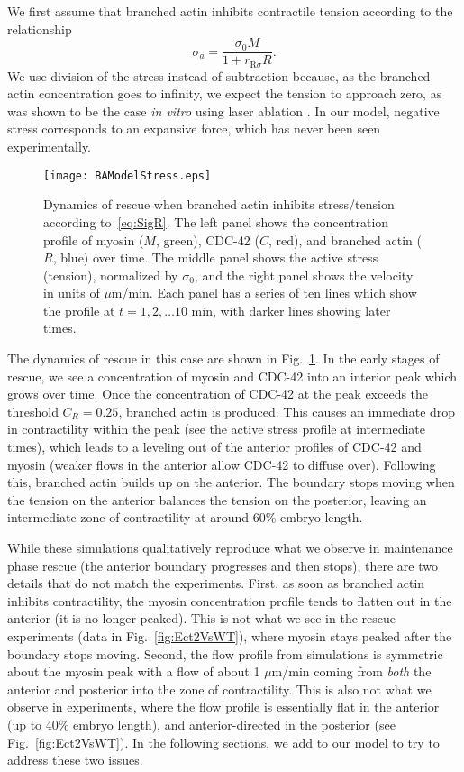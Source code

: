 \documentclass[11pt]{article}
\newcommand{\6}[1]{#1_{\text{6}}}
\newcommand{\3}[1]{#1_{\text{3}}}
\begin{document}
We first assume that branched actin inhibits contractile tension according to the relationship
\begin{equation}
\label{eq:SigR}
\sigma_a = \frac{\sigma_0 M}{1+r_\text{R$\sigma$}R}.
\end{equation}
We use division of the stress instead of subtraction because, as the branched actin concentration goes to infinity, we expect the tension to approach zero, as was shown to be the case \emph{in vitro} using laser ablation \cite{muresan2022f}. In our model, negative stress corresponds to an expansive force, which has never been seen experimentally.

\begin{figure}
\centering
\texttt{[image: BAModelStress.eps]}
\caption{\label{fig:BAInStr} Dynamics of rescue when branched actin inhibits stress/tension according to\ \eqref{eq:SigR}. The left panel shows the concentration profile of myosin ($M$, green), CDC-42 ($C$, red), and branched actin ($R$, blue) over time. The middle panel shows the active stress (tension), normalized by $\sigma_0$, and the right panel shows the velocity in units of $\mu$m/min. Each panel has a series of ten lines which show the profile at $t=1, 2, \dots 10$ min, with darker lines showing later times.}
\end{figure}

The dynamics of rescue in this case are shown in Fig.\ \ref{fig:BAInStr}. In the early stages of rescue, we see a concentration of myosin and CDC-42 into an interior peak which grows over time. Once the concentration of CDC-42 at the peak exceeds the threshold $C_R=0.25$, branched actin is produced. This causes an immediate drop in contractility within the peak (see the active stress profile at intermediate times), which leads to a leveling out of the anterior profiles of CDC-42 and myosin (weaker flows in the anterior allow CDC-42 to diffuse over). Following this, branched actin builds up on the anterior. The boundary stops moving when the tension on the anterior balances the tension on the posterior, leaving an intermediate zone of contractility at around 60\% embryo length. 

While these simulations qualitatively reproduce what we observe in maintenance phase rescue (the anterior boundary progresses and then stops), there are two details that do not match the experiments. First, as soon as branched actin inhibits contractility, the myosin concentration profile tends to flatten out in the anterior (it is no longer peaked). This is not what we see in the rescue experiments (data in Fig.\ \ref{fig:Ect2VsWT}), where myosin stays peaked after the boundary stops moving. Second, the flow profile from simulations is symmetric about the myosin peak with a flow of about 1 $\mu$m/min coming from \emph{both} the anterior and posterior into the zone of contractility. This is also not what we observe in experiments, where the flow profile is essentially flat in the anterior (up to 40\% embryo length), and anterior-directed in the posterior (see Fig.\ \ref{fig:Ect2VsWT}). In the following sections, we add to our model to try to address these two issues.
\end{document}
